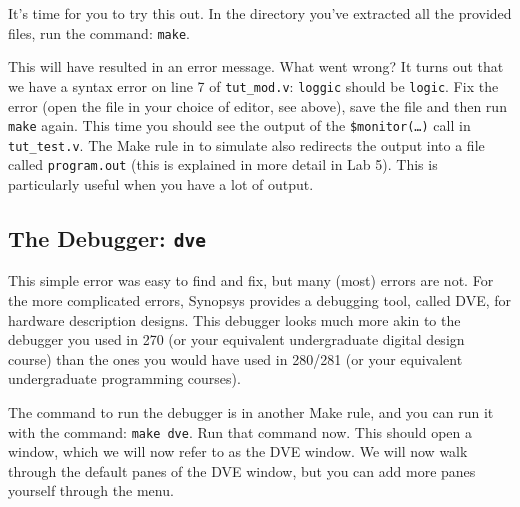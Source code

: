 \documentclass[dvipsnames]{article}
\begin{document}
It's time for you to try this out. In the directory you've extracted all the
provided files, run the command: \texttt{make}.

This will have resulted in an error message. What went wrong? It turns out that
we have a syntax error on line 7 of \texttt{tut\_mod.v}: \texttt{loggic} should be
\texttt{logic}. Fix the error (open the file in your choice of editor, see above),
save the file and then run \texttt{make} again. This time you should see the
output of the \texttt{\$monitor(\dots)} call in \texttt{tut\_test.v}. The Make rule
in to simulate also redirects the output into a file called \texttt{program.out}
(this is explained in more detail in Lab 5). This is particularly useful when
you have a lot of output. 

\subsection{The Debugger: \texttt{dve}}
This simple error was easy to find and fix, but many (most) errors are not. For
the more complicated errors, Synopsys provides a debugging tool, called DVE, for
hardware description designs. This debugger looks much more akin to the debugger
you used in 270 (or your equivalent undergraduate digital design course) than 
the ones you would have used in 280/281 (or your equivalent undergraduate
programming courses).

The command to run the debugger is in another Make rule, and you can run it with
the command: \texttt{make dve}. Run that command now. This should open a
window, which we will now refer to as the DVE window. We will now walk through
the default panes of the DVE window, but you can add more panes yourself
through the  menu.
\end{document}
